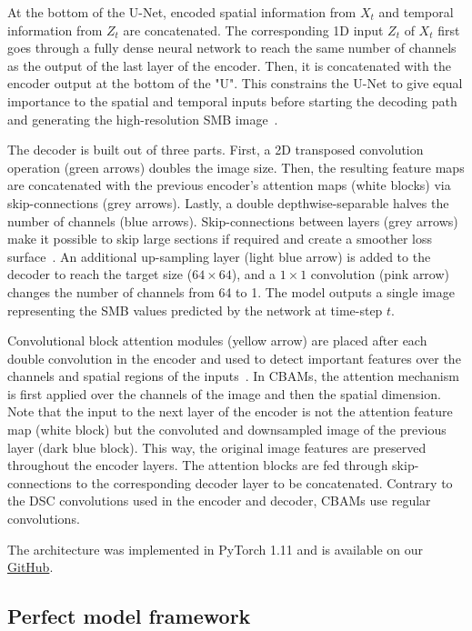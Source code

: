 \documentclass[a4paper,11pt,oneside]{report}
\begin{document}
At the bottom of the U-Net, encoded spatial information from $X_t$ and temporal information from $Z_t$ are concatenated. The corresponding 1D input $Z_t$ of $X_t$ first goes through a fully dense neural network to reach the same number of channels as the output of the last layer of the encoder. Then, it is concatenated with the encoder output at the bottom of the "U". This constrains the U-Net to give equal importance to the spatial and temporal inputs before starting the decoding path and generating the high-resolution SMB image~\cite{Doury}. 

The decoder is built out of three parts. First, a 2D transposed convolution operation (green arrows) doubles the image size. Then, the resulting feature maps are concatenated with the previous encoder's attention maps (white blocks) via skip-connections (grey arrows). Lastly, a double depthwise-separable halves the number of channels (blue arrows). Skip-connections between layers (grey arrows) make it possible to skip large sections if required and create a smoother loss surface~\cite{Li2017}. An additional up-sampling layer (light blue arrow) is added to the decoder to reach the target size ($64\times 64$), and a $1\times1$ convolution (pink arrow) changes the number of channels from 64 to 1. The model outputs a single image representing the SMB values predicted by the network at time-step $t$.

Convolutional block attention modules (yellow arrow) are placed after each double convolution in the encoder and used to detect important features over the channels and spatial regions of the inputs~\cite{smatunet}. In CBAMs, the attention mechanism is first applied over the channels of the image and then the spatial dimension. Note that the input to the next layer of the encoder is not the attention feature map (white block) but the convoluted and downsampled image of the previous layer (dark blue block). This way, the original image features are preserved throughout the encoder layers. The attention blocks are fed through skip-connections to the corresponding decoder layer to be concatenated. Contrary to the DSC convolutions used in the encoder and decoder, CBAMs use regular convolutions.  


The architecture was implemented in PyTorch 1.11 and is available on our \href{https://github.com/marvande/master-thesis}{GitHub}. 

\subsection{Perfect model framework}\label{subsec:perfect-model}
\end{document}
